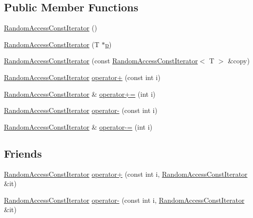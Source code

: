 \subsection*{Public Member Functions}
\begin{DoxyCompactItemize}
\item 
\hyperlink{classprism_1_1_random_access_const_iterator_a5e3fcf144f52339d93d15af4f11a58b4}{Random\+Access\+Const\+Iterator} ()
\item 
\hyperlink{classprism_1_1_random_access_const_iterator_a96024a7e89fb7d2696d0f5a0af4166bf}{Random\+Access\+Const\+Iterator} (T $\ast$\hyperlink{classprism_1_1_forward_const_iterator_ad4e0c824b923c399c6ee381a03e66df2}{p})
\item 
\hyperlink{classprism_1_1_random_access_const_iterator_a529c55043fba2589869eec66c8bbe032}{Random\+Access\+Const\+Iterator} (const \hyperlink{classprism_1_1_random_access_const_iterator}{Random\+Access\+Const\+Iterator}$<$ T $>$ \&copy)
\item 
\hyperlink{classprism_1_1_random_access_const_iterator}{Random\+Access\+Const\+Iterator} \hyperlink{classprism_1_1_random_access_const_iterator_a94bdce83df081d5e3de4c647a4a73b8f}{operator+} (const int i)
\item 
\hyperlink{classprism_1_1_random_access_const_iterator}{Random\+Access\+Const\+Iterator} \& \hyperlink{classprism_1_1_random_access_const_iterator_a468befebae8eb10b525ce2a32d36e3d0}{operator+=} (int i)
\item 
\hyperlink{classprism_1_1_random_access_const_iterator}{Random\+Access\+Const\+Iterator} \hyperlink{classprism_1_1_random_access_const_iterator_a5cd99e5ee4693d9669a9f17de7710935}{operator-\/} (const int i)
\item 
\hyperlink{classprism_1_1_random_access_const_iterator}{Random\+Access\+Const\+Iterator} \& \hyperlink{classprism_1_1_random_access_const_iterator_a4dc3f50f2ab7e1916ae595f78b86062a}{operator-\/=} (int i)
\end{DoxyCompactItemize}
\subsection*{Friends}
\begin{DoxyCompactItemize}
\item 
\hyperlink{classprism_1_1_random_access_const_iterator}{Random\+Access\+Const\+Iterator} \hyperlink{classprism_1_1_random_access_const_iterator_a6bff6ca7fb4bbb4122adc5077b52415d}{operator+} (const int i, \hyperlink{classprism_1_1_random_access_const_iterator}{Random\+Access\+Const\+Iterator} \&it)
\item 
\hyperlink{classprism_1_1_random_access_const_iterator}{Random\+Access\+Const\+Iterator} \hyperlink{classprism_1_1_random_access_const_iterator_a99577c4e83e9b20e01230b8fb377215a}{operator-\/} (const int i, \hyperlink{classprism_1_1_random_access_const_iterator}{Random\+Access\+Const\+Iterator} \&it)
\end{DoxyCompactItemize}
